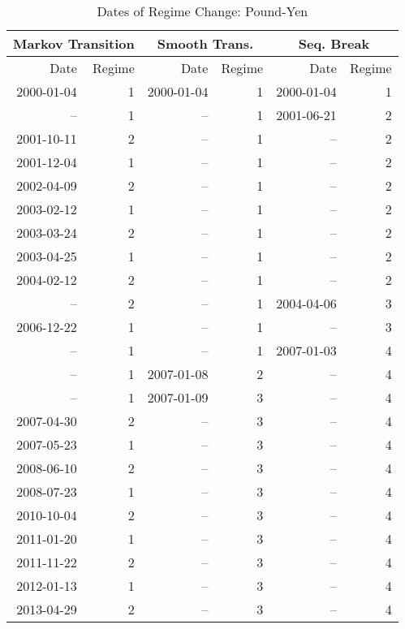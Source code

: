 \documentclass[12pt]{article}
\begin{document}
\begin{table}
	\centering
	\caption{Dates of Regime Change: Pound-Yen}
	\begin{tabular}[c]{r r | r r | r r}
		\midrule
		\multicolumn{2}{c}{Markov Transition} & \multicolumn{2}{c}{Smooth Trans.} & \multicolumn{2}{c}{Seq. Break} \\
		\midrule
		Date & Regime & Date & Regime & Date & Regime \\
		\midrule
		2000-01-04 &  1 & 2000-01-04 &  1 & 2000-01-04 &  1 \\
		        -- &  1 &         -- &  1 & 2001-06-21 &  2 \\
		2001-10-11 &  2 &         -- &  1 &         -- &  2 \\
		2001-12-04 &  1 &         -- &  1 &         -- &  2 \\
		2002-04-09 &  2 &         -- &  1 &         -- &  2 \\
		2003-02-12 &  1 &         -- &  1 &         -- &  2 \\
		2003-03-24 &  2 &         -- &  1 &         -- &  2 \\
		2003-04-25 &  1 &         -- &  1 &         -- &  2 \\
		2004-02-12 &  2 &         -- &  1 &         -- &  2 \\
		        -- &  2 &         -- &  1 & 2004-04-06 &  3 \\
		2006-12-22 &  1 &         -- &  1 &         -- &  3 \\
		        -- &  1 &         -- &  1 & 2007-01-03 &  4 \\
		        -- &  1 & 2007-01-08 &  2 &         -- &  4 \\
				-- &  1 & 2007-01-09 &  3 &         -- &  4 \\
		2007-04-30 &  2 &         -- &  3 &         -- &  4 \\
		2007-05-23 &  1 &         -- &  3 &         -- &  4 \\
		2008-06-10 &  2 &         -- &  3 &         -- &  4 \\
		2008-07-23 &  1 &         -- &  3 &         -- &  4 \\
		2010-10-04 &  2 &         -- &  3 &         -- &  4 \\
		2011-01-20 &  1 &         -- &  3 &         -- &  4 \\
		2011-11-22 &  2 &         -- &  3 &         -- &  4 \\
		2012-01-13 &  1 &         -- &  3 &         -- &  4 \\
		2013-04-29 &  2 &         -- &  3 &         -- &  4 \\

\end{tabular}
\end{table}
\end{document}
